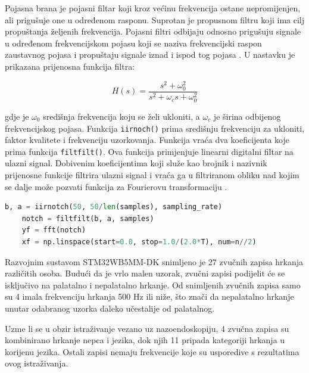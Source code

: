 Pojasna brana je pojasni filtar koji kroz većinu frekvencija ostane nepromijenjen, ali prigušuje one u određenom rasponu. Suprotan je propusnom filtru koji ima cilj propuštanja željenih frekvencija. Pojasni filtri odbijaju odnosno prigušuju signale u određenom frekvencijskom pojasu koji se naziva frekvencijski raspon zaustavnog pojasa i propuštaju signale iznad i ispod tog pojasa \cite{notch}.  U nastavku je prikazana prijenosna funkcija filtra:

\begin{equation}
	H(s) = \dfrac{s^2 + \omega_0^2}{s^2 + \omega_c s + \omega_0^2}
\end{equation}

\noindent gdje je \(\omega_0\) središnja frekvencija koju se želi ukloniti, a \(\omega_c\) je širina odbijenog frekvencijskog pojasa.  Funkcija \lstinline|iirnoch()| prima središnju frekvenciju za ukloniti, faktor kvalitete i frekvenciju uzorkovanja. Funkcija vraća dva koeficijenta koje prima funkcija \lstinline|filtfilt()|. Ova funkcija primjenjuje linearni digitalni filtar na ulazni signal. Dobivenim koeficijentima koji služe kao brojnik i nazivnik prijenosne funkcije filtrira ulazni signal i vraća ga u filtriranom obliku nad kojim se dalje može pozvati funkcija za Fourierovu transformaciju \cite{scipy}. 

\begin{lstlisting}[language=Python, caption={Primjena \textit{notch} filtra i Fourierove transformacije}]
	b, a = iirnotch(50, 50/len(samples), sampling_rate)
	notch = filtfilt(b, a, samples)
	yf = fft(notch)
	xf = np.linspace(start=0.0, stop=1.0/(2.0*T), num=n//2)
\end{lstlisting}

Razvojnim sustavom STM32WB5MM-DK snimljeno je 27 zvučnih zapisa hrkanja različitih osoba. Budući da je vrlo malen uzorak, zvučni zapisi podijelit će se isključivo na palatalno i nepalatalno hrkanje. Od snimljenih zvučnih zapisa samo su 4 imala frekvenciju hrkanja 500 Hz ili niže, što znači da nepalatalno hrkanje unutar odabranog uzorka daleko učestalije od palatalnog.

Uzme li se u obzir istraživanje vezano uz nazoendoskopiju, 4 zvučna zapisa su kombinirano hrkanje nepca i jezika, dok njih 11 pripada kategoriji hrkanja u korijenu jezika. Ostali zapisi nemaju frekvencije koje su usporedive s rezultatima ovog istraživanja.